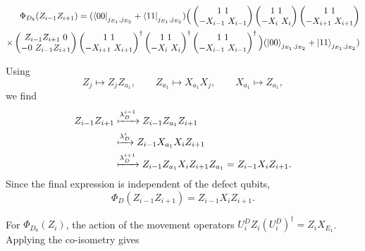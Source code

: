 \documentclass{article}
\theoremstyle{definition}
\begin{document}
\begin{align}
    \Phi_{D_8}(Z_{i-1}Z_{i+1}) = (\bra{00}_{j_{E_1},j_{E_2}} + \bra{11}_{j_{E_1},j_{E_2}})\Big(\begin{pmatrix}
        1 \ 1\\ -X_{i-1}\ X_{i-1}
    \end{pmatrix}\begin{pmatrix}
        1 \ 1\\ -X_i\ X_i
    \end{pmatrix}\begin{pmatrix}
        1 \ 1\\ -X_{i+1}\ X_{i+1}
    \end{pmatrix}\\
     \times \begin{pmatrix}
        Z_{i-1}Z_{i+1} \ 0\\ -0\ Z_{i-1}Z_{i+1}
    \end{pmatrix}\begin{pmatrix}
        1 \ 1\\ -X_{i+1}\ X_{i+1}
    \end{pmatrix}^\dagger\begin{pmatrix}
        1 \ 1\\ -X_i\ X_i
    \end{pmatrix}^\dagger\begin{pmatrix}
        1 \ 1\\ -X_{i-1}\ X_{i-1}
    \end{pmatrix}^\dagger\Big)(\ket{00}_{j_{E_1},j_{E_2}} + \ket{11}_{j_{E_1},j_{E_2}})
\end{align}


Using
\[
    Z_j\mapsto Z_jZ_{a_1},\qquad
    Z_{a_1}\mapsto X_{a_1}X_j,\qquad
    X_{a_1}\mapsto Z_{a_1},
\]
we find
\[
\begin{aligned}
    Z_{i-1}Z_{i+1}
    &\xmapsto{\lambda_D^{i-1}}
    Z_{i-1}Z_{a_1}Z_{i+1}  \\
    &\xmapsto{\lambda_D^{i}}
    Z_{i-1}X_{a_1}X_iZ_{i+1} \\
    &\xmapsto{\lambda_D^{i+1}}
    Z_{i-1}Z_{a_1}X_iZ_{i+1}Z_{a_1}
    =
    Z_{i-1}X_iZ_{i+1}.
\end{aligned}
\]
Since the final expression is independent of the defect qubits,
\[
    \Phi_D(Z_{i-1}Z_{i+1})
    =
    Z_{i-1}X_iZ_{i+1}.
\]


\color{black}


For $\Phi_{D_8}(Z_i)$, the action of the movement operators  $U^D_iZ_i(U^D_i)^\dagger = Z_iX_{E_1}$.  Applying the co-isometry gives
\end{document}
